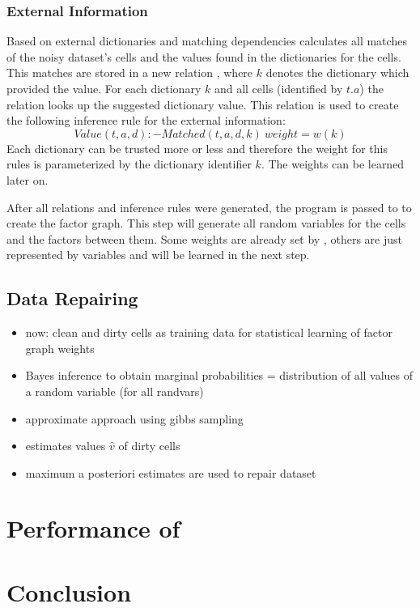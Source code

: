   \subsubsection*{External Information}
  Based on external dictionaries and matching dependencies \holoclean{} calculates all matches of the noisy dataset's cells and the values found in the dictionaries for the cells.
  This matches are stored in a new relation , where $k$ denotes the dictionary which provided the value.
  For each dictionary $k$ and all cells (identified by $t.a$) the relation  looks up the suggested dictionary value.
  This relation is used to create the following inference rule for the external information:
  \begin{equation}
    Value(t,a,d):-Matched(t,a,d,k)\ weight=w(k)\label{equ:matching}
  \end{equation}
  Each dictionary can be trusted more or less and therefore the weight for this rules is parameterized by the dictionary identifier $k$.
  The weights can be learned later on.
  
  \bigskip
  After all relations and inference rules were generated, the \ddlog{} program is passed to \deepdive{} to create the factor graph.
  This step will generate all random variables for the cells and the factors between them.
  Some weights are already set by \holoclean{}, others are just represented by variables and will be learned in the next step.
  
  \subsection{Data Repairing}
  \begin{itemize}
    \item now: clean and dirty cells as training data for statistical learning of factor graph weights
    \item Bayes inference to obtain marginal probabilities = distribution of all values of a random variable (for all randvars)
    \item approximate approach using gibbs sampling~\cite{gibbssampling}
    \item estimates values $\hat{v}$ of dirty cells
    \item maximum a posteriori estimates are used to repair dataset
  \end{itemize}

\section{Performance of \holoclean{}}\label{sec:performance}

\section{Conclusion}\label{sec:conclusion}